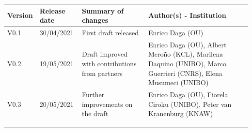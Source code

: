 \begin{tabular}{|l|l|p{5.5cm}|p{5.5cm}|}\hline
  \textbf{Version} & \textbf{Release date} & \textbf{Summary of changes} & \textbf{Author(s) - Institution}\\\hline  
  V0.1 & 30/04/2021 & First draft released & Enrico Daga (OU)\\\hline  
  V0.2 & 19/05/2021 & Draft improved with contributions from partners & Enrico Daga (OU), Albert Mero\~no (KCL), Marilena Daquino (UNIBO), Marco Guerrieri (CNRS), Elena Musumeci (UNIBO) \\\hline  
  V0.3 & 20/05/2021 & Further improvements on the draft & Enrico Daga (OU), Fiorela Ciroku (UNIBO), Peter van Kranenburg (KNAW) \\\hline  
  & & & \\\hline  
  & & & \\\hline  
  & & & \\\hline  
  \end{tabular}

  \clearpage




